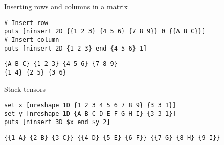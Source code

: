 \documentclass{article}
\begin{document}
\begin{example}{Inserting rows and columns in a matrix}
\begin{lstlisting}
# Insert row
puts [ninsert 2D {{1 2 3} {4 5 6} {7 8 9}} 0 {{A B C}}]
# Insert column
puts [ninsert 2D {1 2 3} end {4 5 6} 1]
\end{lstlisting}
\tcblower
\begin{lstlisting}
{A B C} {1 2 3} {4 5 6} {7 8 9}
{1 4} {2 5} {3 6}
\end{lstlisting}
\end{example}

\begin{example}{Stack tensors}
\begin{lstlisting}
set x [nreshape 1D {1 2 3 4 5 6 7 8 9} {3 3 1}]
set y [nreshape 1D {A B C D E F G H I} {3 3 1}]
puts [ninsert 3D $x end $y 2]
\end{lstlisting}
\tcblower
\begin{lstlisting}
{{1 A} {2 B} {3 C}} {{4 D} {5 E} {6 F}} {{7 G} {8 H} {9 I}}
\end{lstlisting}
\end{example}
\end{document}
